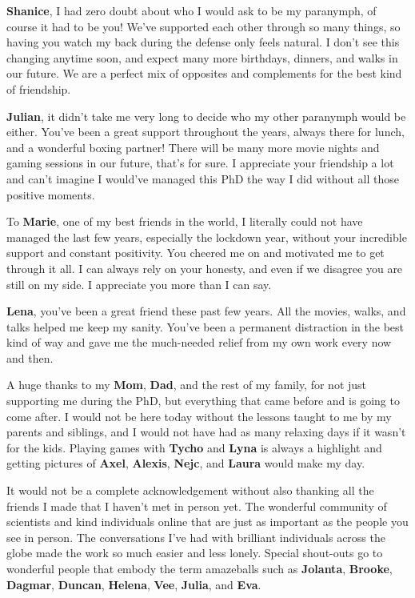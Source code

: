 \begin{refsection}
\textbf{Shanice}, I had zero doubt about who I would ask to be my paranymph, of course it had to be you! We’ve supported each other through so many things, so having you watch my back during the defense only feels natural. I don’t see this changing anytime soon, and expect many more birthdays, dinners, and walks in our future. We are a perfect mix of opposites and complements for the best kind of friendship.

\newpage
\AddLabels

\textbf{Julian}, it didn’t take me very long to decide who my other paranymph would be either. You’ve been a great support throughout the years, always there for lunch, and a wonderful boxing partner! There will be many more movie nights and gaming sessions in our future, that’s for sure. I appreciate your friendship a lot and can’t imagine I would’ve managed this PhD the way I did without all those positive moments.

To \textbf{Marie}, one of my best friends in the world, I literally could not have managed the last few years, especially the lockdown year, without your incredible support and constant positivity. You cheered me on and motivated me to get through it all. I can always rely on your honesty, and even if we disagree you are still on my side. I appreciate you more than I can say. 

\textbf{Lena}, you’ve been a great friend these past few years. All the movies, walks, and talks helped me keep my sanity. You’ve been a permanent distraction in the best kind of way and gave me the much-needed relief from my own work every now and then.

A huge thanks to my \textbf{Mom}, \textbf{Dad}, and the rest of my family, for not just supporting me during the PhD, but everything that came before and is going to come after. I would not be here today without the lessons taught to me by my parents and siblings, and I would not have had as many relaxing days if it wasn’t for the kids. Playing games with \textbf{Tycho} and \textbf{Lyna} is always a highlight and getting pictures of \textbf{Axel}, \textbf{Alexis}, \textbf{Nejc}, and \textbf{Laura} would make my day.

It would not be a complete acknowledgement without also thanking all the friends I made that I haven’t met in person yet. The wonderful community of scientists and kind individuals online that are just as important as the people you see in person. The conversations I’ve had with brilliant individuals across the globe made the work so much easier and less lonely. Special shout-outs go to wonderful people that embody the term amazeballs such as \textbf{Jolanta}, \textbf{Brooke}, \textbf{Dagmar}, \textbf{Duncan}, \textbf{Helena}, \textbf{Vee}, \textbf{Julia}, and \textbf{Eva}.


\end{refsection}
